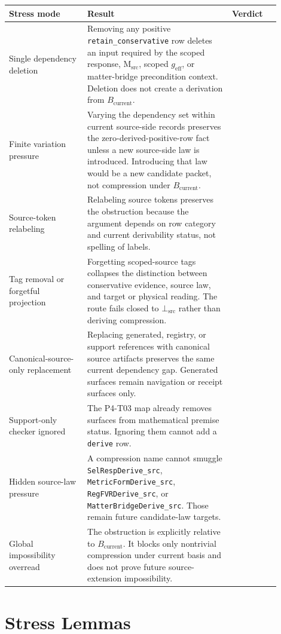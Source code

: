 \documentclass[11pt]{article}
\newcommand{\geff}{g_{\mathrm{eff}}}
\newcommand{\Bcur}{B_{\mathrm{current}}}
\newcommand{\ProofAuthFalse}{\mathrm{proof\_authority=false}}
\newcommand{\BottomSrc}{\bot_{\mathrm{src}}}
\newcommand{\StressPass}{\mathrm{STRESS\mbox{-}PASS}}
\begin{document}
\begin{longtable}{p{0.26\linewidth}p{0.48\linewidth}p{0.16\linewidth}}
\toprule
Stress mode & Result & Verdict \\
\midrule
Single dependency deletion & Removing any positive
\texttt{retain\_conservative} row deletes an input required by the scoped
response, \(\mathrm{M}_{\mathrm{src}}\), scoped \(\geff\), or matter-bridge
precondition context. Deletion does not create a derivation from \(\Bcur\). &
\StressPass \\
Finite variation pressure & Varying the dependency set within current
source-side records preserves the zero-derived-positive-row fact unless a new
source-side law is introduced. Introducing that law would be a new candidate
packet, not compression under \(\Bcur\). & \StressPass \\
Source-token relabeling & Relabeling source tokens preserves the obstruction
because the argument depends on row category and current derivability status,
not spelling of labels. & \StressPass \\
Tag removal or forgetful projection & Forgetting scoped-source tags collapses
the distinction between conservative evidence, source law, and target or
physical reading. The route fails closed to \(\BottomSrc\) rather than deriving
compression. & \StressPass \\
Canonical-source-only replacement & Replacing generated, registry, or
support references with canonical source artifacts preserves the same current
dependency gap. Generated surfaces remain navigation or receipt surfaces only.
& \StressPass \\
Support-only checker ignored & The P4-T03 map already removes
\ProofAuthFalse{} surfaces from mathematical premise status. Ignoring them
cannot add a \texttt{derive} row. & \StressPass \\
Hidden source-law pressure & A compression name cannot smuggle
\texttt{SelRespDerive\_src}, \texttt{MetricFormDerive\_src},
\texttt{RegFVRDerive\_src}, or \texttt{MatterBridgeDerive\_src}. Those remain
future candidate-law targets. & \StressPass \\
Global impossibility overread & The obstruction is explicitly relative to
\(\Bcur\). It blocks only nontrivial compression under current basis and does
not prove future source-extension impossibility. & \StressPass \\
\bottomrule
\end{longtable}

\section{Stress Lemmas}
\end{document}
